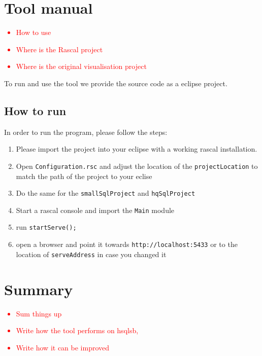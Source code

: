 \documentclass{uva-inf-article}
\newcommand\todo[1]{\textcolor{red}{#1}}
\begin{document}
\section{Tool manual}
\todo {
	\begin{itemize}
		\item{How to use}
		\item{Where is the Rascal project}
		\item{Where is the original visualisation project }
	\end{itemize}
}

To run and use the tool we provide the source code as a eclipse project.

\subsection{How to run}

In order to run the program, please follow the steps:

\begin{enumerate}
\item
  Please import the project into your eclipse with a working rascal
  installation.
\item
  Open \texttt{Configuration.rsc} and adjust the location of the
  \texttt{projectLocation} to match the path of the project to your
  eclise
\item
  Do the same for the \texttt{smallSqlProject} and \texttt{hqSqlProject}
\item
  Start a rascal console and import the \texttt{Main} module
\item
  run \texttt{startServe();}
\item
  open a browser and point it towards \texttt{http://localhost:5433} or
  to the location of \texttt{serveAddress} in case you changed it
\end{enumerate}


\section{Summary}
\todo {
	\begin{itemize}
		\item{Sum things up}
		\item{Write how the tool performs on hsqlsb,}
		\item{Write how it can be improved}
	\end{itemize}
}




\printbibliography


\end{document}

